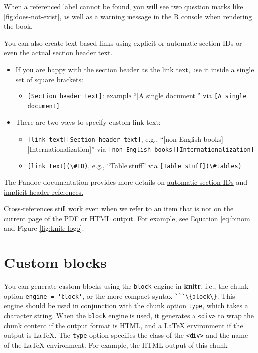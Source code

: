 \documentclass[doctor,openright,twoside]{sjtuthesis}
\providecommand{\tightlist}{%
    \setlength{\itemsep}{0pt}\setlength{\parskip}{0pt}}
\newcommand{\passthrough}[1]{#1}
\theoremstyle{plain}
\theoremstyle{definition}
\theoremstyle{remark}
\theoremstyle{ocrenumbox}
\theoremstyle{plain}
\begin{document}
When a referenced label cannot be found, you will see two question marks like \ref{fig:does-not-exist}, as well as a warning message in the R console when rendering the book.

You can also create text-based links using explicit or automatic section IDs or even the actual section header text.

\begin{itemize}
\tightlist
\item
  If you are happy with the section header as the link text, use it inside a single set of square brackets:

  \begin{itemize}
  \tightlist
  \item
    \passthrough{\lstinline![Section header text]!}: example ``{[}A single document{]}'' via \passthrough{\lstinline![A single document]!}
  \end{itemize}
\item
  There are two ways to specify custom link text:

  \begin{itemize}
  \tightlist
  \item
    \passthrough{\lstinline![link text][Section header text]!}, e.g., ``{[}non-English books{]}{[}Internationalization{]}'' via \passthrough{\lstinline![non-English books][Internationalization]!}
  \item
    \passthrough{\lstinline![link text](\#ID)!}, e.g., ``\protect\hyperlink{tables}{Table stuff}'' via \passthrough{\lstinline![Table stuff](\#tables)!}
  \end{itemize}
\end{itemize}

The Pandoc documentation provides more details on \href{http://pandoc.org/MANUAL.html\#extension-auto_identifiers}{automatic section IDs} and \href{http://pandoc.org/MANUAL.html\#extension-implicit_header_references}{implicit header references.}

Cross-references still work even when we refer to an item that is not on the current page of the PDF or HTML output. For example, see Equation \eqref{eq:binom} and Figure \ref{fig:knitr-logo}.

\hypertarget{custom-blocks}{%
\section{Custom blocks}\label{custom-blocks}}

You can generate custom blocks using the \passthrough{\lstinline!block!} engine in \textbf{knitr}, i.e., the chunk option \passthrough{\lstinline!engine = 'block'!}, or the more compact syntax \passthrough{\lstinline!```\{block\}!}. This engine should be used in conjunction with the chunk option \passthrough{\lstinline!type!}, which takes a character string. When the \passthrough{\lstinline!block!} engine is used, it generates a \passthrough{\lstinline!<div>!} to wrap the chunk content if the output format is HTML, and a LaTeX environment if the output is LaTeX. The \passthrough{\lstinline!type!} option specifies the class of the \passthrough{\lstinline!<div>!} and the name of the LaTeX environment. For example, the HTML output of this chunk
\end{document}
